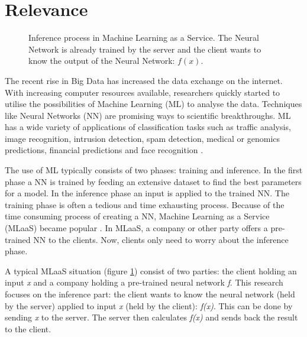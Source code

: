 \documentclass[../thesis.tex]{subfiles}
\begin{document}
\section{Relevance}
\label{section:relevance}
\begin{figure}
    \centering
       
    \caption{Inference process in Machine Learning as a Service. The Neural Network is already trained by the server and the client wants to know the output of the Neural Network: $f(x)$.}
    \label{fig:mlaas}
\end{figure}
The recent rise in Big Data has increased the data exchange on the internet. With increasing computer resources available, researchers quickly started to utilise the possibilities of Machine Learning (ML) to analyse the data.  Techniques like Neural Networks (NN) are promising ways to scientific breakthroughs. ML has a wide variety of applications of classification tasks such as traffic analysis, image recognition, intrusion detection,  spam detection, medical or genomics predictions,  financial predictions and face recognition \parencite{dowlin2017,islam2011, bachrach16, kaiming215}.

The use of ML typically consists of two phases: training and inference. In the first phase a NN is trained by feeding an extensive dataset to find the best parameters for a model. In the inference phase an input is applied to the trained NN. The training phase is often a tedious and time exhausting process. Because of the time consuming process of creating a NN, Machine Learning as a Service (MLaaS) became popular \parencite{ribeiro2015mlaasml}. In MLaaS, a company or other party offers a pre-trained NN to the clients. Now, clients only need to worry about the inference phase.

A typical MLaaS situation (figure \ref{fig:mlaas}) consist of two parties: the client holding an input \textit{x} and a company holding a pre-trained neural network \textit{f}. This research focuses on the inference part: the client wants to know the neural network (held by the server) applied to input \textit{x} (held by the client): \textit{f(x)}. This can be done by sending \textit{x} to the server. The server then calculates \textit{f(x)} and sends back the result to the client.

\end{document}
